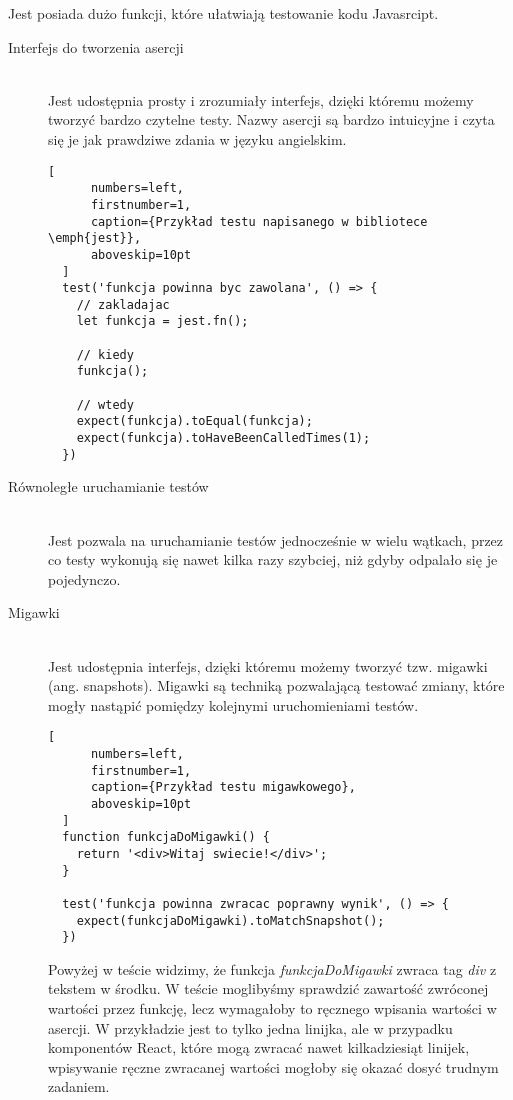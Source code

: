 Jest posiada dużo funkcji, które ułatwiają testowanie kodu Javasrcipt.
\begin{description}
  \item[Interfejs do tworzenia asercji] \hfill \\ Jest udostępnia prosty i zrozumiały interfejs, dzięki któremu możemy tworzyć bardzo czytelne testy. Nazwy asercji są bardzo intuicyjne i czyta się je jak prawdziwe zdania w języku angielskim.
  \begin{addmargin}[6mm]{0mm}
  \begin{lstlisting}[
      numbers=left,
      firstnumber=1,
      caption={Przykład testu napisanego w bibliotece \emph{jest}},
      aboveskip=10pt
  ]
  test('funkcja powinna byc zawolana', () => {
    // zakladajac
    let funkcja = jest.fn();

    // kiedy
    funkcja();

    // wtedy
    expect(funkcja).toEqual(funkcja);
    expect(funkcja).toHaveBeenCalledTimes(1);
  })
  \end{lstlisting}
  \end{addmargin}

  \item[Równoległe uruchamianie testów] \hfill \\ Jest pozwala na uruchamianie testów jednocześnie w wielu wątkach, przez co testy wykonują się nawet kilka razy szybciej, niż gdyby odpalało się je pojedynczo.
  \item[Migawki] \hfill \\ Jest udostępnia interfejs, dzięki któremu możemy tworzyć tzw. migawki (ang. snapshots). Migawki są techniką pozwalającą testować zmiany, które mogły nastąpić pomiędzy kolejnymi uruchomieniami testów.
  \begin{addmargin}[6mm]{0mm}
  \begin{lstlisting}[
      numbers=left,
      firstnumber=1,
      caption={Przykład testu migawkowego},
      aboveskip=10pt
  ]
  function funkcjaDoMigawki() {
    return '<div>Witaj swiecie!</div>';
  }

  test('funkcja powinna zwracac poprawny wynik', () => {
    expect(funkcjaDoMigawki).toMatchSnapshot();
  })
  \end{lstlisting}
  \end{addmargin}
  Powyżej w teście widzimy, że funkcja \emph{funkcjaDoMigawki} zwraca tag \emph{div} z tekstem w środku. W teście moglibyśmy sprawdzić zawartość zwróconej wartości przez funkcję, lecz wymagałoby to ręcznego wpisania wartości w asercji. W przykładzie jest to tylko jedna linijka, ale w przypadku komponentów React, które mogą zwracać nawet kilkadziesiąt linijek, wpisywanie ręczne zwracanej wartości mogłoby się okazać dosyć trudnym zadaniem.


\end{description}
